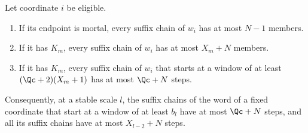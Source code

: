 \begin{lemma}\label{lem:chains}
Let coordinate $i$ be eligible.
\begin{enumerate}
\item\label{it:chains-mortal} If its endpoint is mortal, every suffix chain
  of $w_i$ has at most $N-1$ members.
\item\label{it:chains-K} If it has $K_m$, every suffix chain of $w_i$ has at
  most $X_m+N$ members.
\item\label{it:chains-window} If it has $K_m$, every suffix chain of $w_i$
  that starts at a window of at least $(\Qc+2)(X_m+1)$ has at most $\Qc+N$
  steps.
\end{enumerate}
Consequently, at a stable scale $l$, the suffix chains of the word of a
fixed coordinate that start at a window of at least $b_l$ have at most
$\Qc+N$ steps, and all its suffix chains have at most $X_{l-2}+N$ steps.
\end{lemma}

